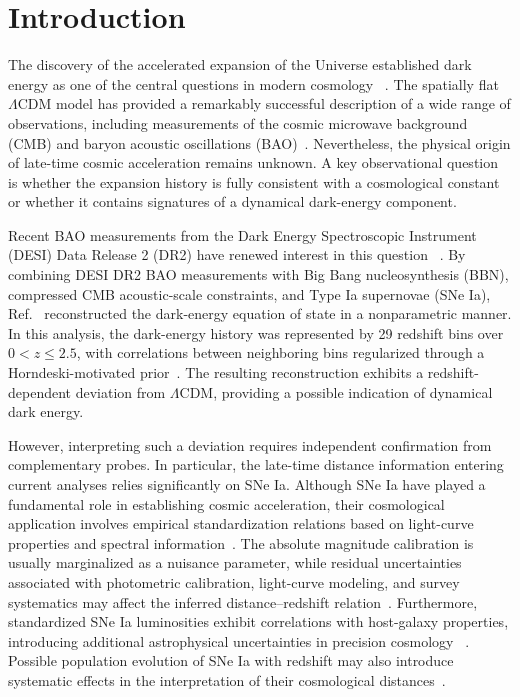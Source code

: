 \documentclass[
  aps,
  prd,
  twocolumn,
  nofootinbib,
  superscriptaddress,
  floatfix,
  longbibliography
]{revtex4-2}
\begin{document}
\section{Introduction}
\label{sec:introduction}

The discovery of the accelerated expansion of the Universe established dark
energy as one of the central questions in modern cosmology
~\cite{Riess1998,Perlmutter1999}. The spatially flat $\Lambda$CDM model has
provided a remarkably successful description of a wide range of observations,
including measurements of the cosmic microwave background (CMB) and baryon
acoustic oscillations (BAO)~\cite{2020}. Nevertheless, the physical origin of
late-time cosmic acceleration remains unknown. A key observational question is
whether the expansion history is fully consistent with a cosmological constant
or whether it contains signatures of a dynamical dark-energy component.

Recent BAO measurements from the Dark Energy Spectroscopic Instrument (DESI)
Data Release 2 (DR2) have renewed interest in this question
~\cite{DESIDR2Cosmology,DESIDR2ExtendedDE}. By combining DESI DR2 BAO
measurements with Big Bang nucleosynthesis (BBN), compressed CMB acoustic-scale
constraints, and Type Ia supernovae (SNe Ia), Ref.~\cite{Gu_2025} reconstructed
the dark-energy equation of state in a nonparametric manner. In this analysis,
the dark-energy history was represented by 29 redshift bins over
$0<z\leq2.5$, with correlations between neighboring bins regularized through a
Horndeski-motivated prior~\cite{Raveri2017}. The resulting reconstruction
exhibits a redshift-dependent deviation from $\Lambda$CDM, providing a possible
indication of dynamical dark energy.

However, interpreting such a deviation requires independent confirmation from
complementary probes. In particular, the late-time distance information entering
current analyses relies significantly on SNe Ia. Although SNe Ia have played a
fundamental role in establishing cosmic acceleration, their cosmological
application involves empirical standardization relations based on light-curve
properties and spectral information~\cite{Phillips1993,Guy2007}. The absolute
magnitude calibration is usually marginalized as a nuisance parameter, while
residual uncertainties associated with photometric calibration, light-curve
modeling, and survey systematics may affect the inferred distance--redshift
relation~\cite{Scolnic2018,Brout2022}. Furthermore, standardized SNe Ia
luminosities exhibit correlations with host-galaxy properties, introducing
additional astrophysical uncertainties in precision cosmology
~\cite{Kelly2010}. Possible population evolution of SNe Ia with
redshift may also introduce systematic effects in the interpretation of their
cosmological distances~\cite{Childress2014}.
\end{document}
